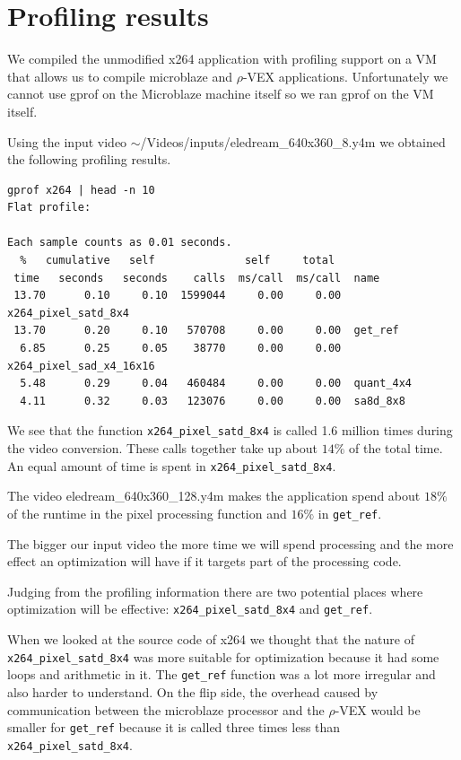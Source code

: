 \documentclass{article}
\newcommand{\rvex}{\ensuremath{\rho}-VEX}
\newcommand{\satd}{\texttt{x264\_pixel\_satd\_8x4}}
\newcommand{\getref}{\texttt{get\_ref}}
\begin{document}
\section{Profiling results}

We compiled the unmodified x264 application with profiling support on a VM that
allows us to compile microblaze and \rvex{} applications.
Unfortunately we
cannot use gprof on the Microblaze machine itself so we ran gprof on the VM
itself.

Using the input video $\sim$/Videos/inputs/eledream\_640x360\_8.y4m we obtained
the following profiling results.

\begin{small}
\begin{lstlisting}
gprof x264 | head -n 10
Flat profile:

Each sample counts as 0.01 seconds.
  %   cumulative   self              self     total
 time   seconds   seconds    calls  ms/call  ms/call  name
 13.70      0.10     0.10  1599044     0.00     0.00  x264_pixel_satd_8x4
 13.70      0.20     0.10   570708     0.00     0.00  get_ref
  6.85      0.25     0.05    38770     0.00     0.00  x264_pixel_sad_x4_16x16
  5.48      0.29     0.04   460484     0.00     0.00  quant_4x4
  4.11      0.32     0.03   123076     0.00     0.00  sa8d_8x8
\end{lstlisting}\end{small}

We see that the function \satd{} is called 1.6 million times during the video
conversion. These calls together take up about $14\%$ of the total time. An
equal amount of time is spent in \satd{}.

The video eledream\_640x360\_128.y4m makes the application spend about $18\%$
of the runtime in the pixel processing function and $16\%$ in \getref{}.

The bigger our input video the more time we will spend processing and the more
effect an optimization will have if it targets part of the processing code.

Judging from the profiling information there are two potential places where
optimization will be effective: \satd{} and \getref{}.

When we looked at the source code of x264 we thought that the nature of \satd{}
was more suitable for optimization because it had some loops and arithmetic in
it. The \getref{} function was a lot more irregular and also harder to
understand. On the flip side, the overhead caused by communication between the
microblaze processor and the \rvex{} would be smaller for \getref{} because it
is called three times less than \satd{}.
\end{document}

